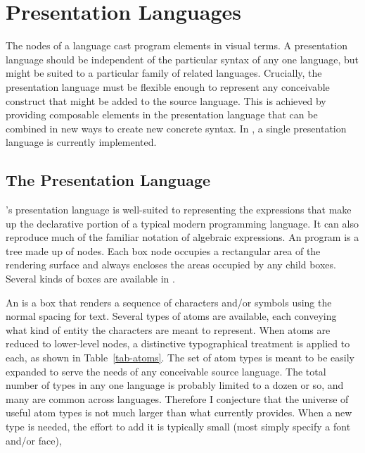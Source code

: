 %
%

\section{Presentation Languages}
\label{expr}
The nodes of a  language cast program elements in visual terms. A presentation language should be independent of the particular syntax of any one language, but might be suited to a particular family of related languages. Crucially, the presentation language must be flexible enough to represent any conceivable construct that might be added to the source language. This is achieved by providing composable elements in the presentation language that can be combined in new ways to create new concrete syntax. In \Meta, a single presentation language is currently implemented.

\subsection{The \textit{} Presentation Language}

\Meta's  presentation language is well-suited to representing the expressions that make up the declarative portion of a typical modern programming language. It can also reproduce much of the familiar notation of algebraic expressions. An  program is a tree made up of  nodes. Each box node occupies a rectangular area of the rendering surface and always encloses the areas occupied by any child boxes. Several kinds of boxes are available in .

An  is a box that renders a sequence of characters and/or symbols using the normal spacing for text. Several types of atoms are available, each conveying what kind of entity the characters are meant to represent. When atoms are reduced to lower-level nodes, a distinctive typographical treatment is applied to each, as shown in Table~\ref{tab-atoms}. The set of atom types is meant to be easily expanded to serve the needs of any conceivable source language. The total number of types in any one language is probably limited to a dozen or so, and many are common across languages. Therefore I conjecture that the universe of useful atom types is not much larger than what  currently provides. When a new type is needed, the effort to add it is typically small (most simply specify a font and/or face), 


